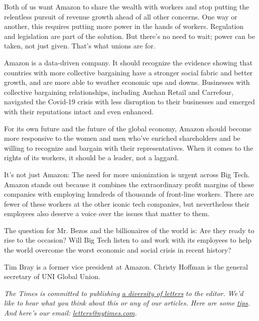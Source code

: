Both of us want Amazon to share the wealth with workers and stop putting
the relentless pursuit of revenue growth ahead of all other concerns.
One way or another, this requires putting more power in the hands of
workers. Regulation and legislation are part of the solution. But
there's no need to wait; power can be taken, not just given. That's what
unions are for.

Amazon is a data-driven company. It should recognize the evidence
showing that countries with more collective bargaining have a stronger
social fabric and better growth, and are more able to weather economic
ups and downs. Businesses with collective bargaining relationships,
including Auchan Retail and Carrefour, navigated the Covid-19 crisis
with less disruption to their businesses and emerged with their
reputations intact and even enhanced.

For its own future and the future of the global economy, Amazon should
become more responsive to the women and men who've enriched shareholders
and be willing to recognize and bargain with their representatives. When
it comes to the rights of its workers, it should be a leader, not a
laggard.

It's not just Amazon: The need for more unionization is urgent across
Big Tech. Amazon stands out because it combines the extraordinary profit
margins of these companies with employing hundreds of thousands of
front-line workers. There are fewer of these workers at the other iconic
tech companies, but nevertheless their employees also deserve a voice
over the issues that matter to them.

The question for Mr. Bezos and the billionaires of the world is: Are
they ready to rise to the occasion? Will Big Tech listen to and work
with its employees to help the world overcome the worst economic and
social crisis in recent history?

Tim Bray is a former vice president at Amazon. Christy Hoffman is the
general secretary of UNI Global Union.

\emph{The Times is committed to publishing}
\href{https://www.nytimes.com/2019/01/31/opinion/letters/letters-to-editor-new-york-times-women.html}{\emph{a
diversity of letters}} \emph{to the editor. We'd like to hear what you
think about this or any of our articles. Here are some}
\href{https://help.nytimes.com/hc/en-us/articles/115014925288-How-to-submit-a-letter-to-the-editor}{\emph{tips}}\emph{.
And here's our email:}
\href{mailto:letters@nytimes.com}{\emph{letters@nytimes.com}}\emph{.}

